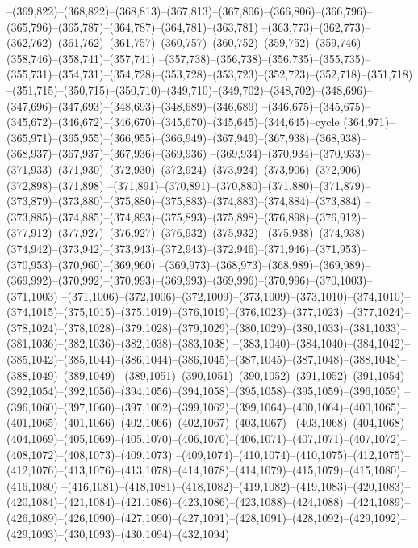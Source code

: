 --(369,822)--(368,822)--(368,813)--(367,813)--(367,806)--(366,806)--(366,796)--(365,796)--(365,787)--(364,787)--(364,781)--(363,781)
--(363,773)--(362,773)--(362,762)--(361,762)--(361,757)--(360,757)--(360,752)--(359,752)--(359,746)--(358,746)--(358,741)--(357,741)
--(357,738)--(356,738)--(356,735)--(355,735)--(355,731)--(354,731)--(354,728)--(353,728)--(353,723)--(352,723)--(352,718)--(351,718)
--(351,715)--(350,715)--(350,710)--(349,710)--(349,702)--(348,702)--(348,696)--(347,696)--(347,693)--(348,693)--(348,689)--(346,689)
--(346,675)--(345,675)--(345,672)--(346,672)--(346,670)--(345,670)--(345,645)--(344,645)--cycle
(364,971)--(365,971)--(365,955)--(366,955)--(366,949)--(367,949)--(367,938)--(368,938)--(368,937)--(367,937)--(367,936)--(369,936)
--(369,934)--(370,934)--(370,933)--(371,933)--(371,930)--(372,930)--(372,924)--(373,924)--(373,906)--(372,906)--(372,898)--(371,898)
--(371,891)--(370,891)--(370,880)--(371,880)--(371,879)--(373,879)--(373,880)--(375,880)--(375,883)--(374,883)--(374,884)--(373,884)
--(373,885)--(374,885)--(374,893)--(375,893)--(375,898)--(376,898)--(376,912)--(377,912)--(377,927)--(376,927)--(376,932)--(375,932)
--(375,938)--(374,938)--(374,942)--(373,942)--(373,943)--(372,943)--(372,946)--(371,946)--(371,953)--(370,953)--(370,960)--(369,960)
--(369,973)--(368,973)--(368,989)--(369,989)--(369,992)--(370,992)--(370,993)--(369,993)--(369,996)--(370,996)--(370,1003)--(371,1003)
--(371,1006)--(372,1006)--(372,1009)--(373,1009)--(373,1010)--(374,1010)--(374,1015)--(375,1015)--(375,1019)--(376,1019)--(376,1023)--(377,1023)
--(377,1024)--(378,1024)--(378,1028)--(379,1028)--(379,1029)--(380,1029)--(380,1033)--(381,1033)--(381,1036)--(382,1036)--(382,1038)--(383,1038)
--(383,1040)--(384,1040)--(384,1042)--(385,1042)--(385,1044)--(386,1044)--(386,1045)--(387,1045)--(387,1048)--(388,1048)--(388,1049)--(389,1049)
--(389,1051)--(390,1051)--(390,1052)--(391,1052)--(391,1054)--(392,1054)--(392,1056)--(394,1056)--(394,1058)--(395,1058)--(395,1059)--(396,1059)
--(396,1060)--(397,1060)--(397,1062)--(399,1062)--(399,1064)--(400,1064)--(400,1065)--(401,1065)--(401,1066)--(402,1066)--(402,1067)--(403,1067)
--(403,1068)--(404,1068)--(404,1069)--(405,1069)--(405,1070)--(406,1070)--(406,1071)--(407,1071)--(407,1072)--(408,1072)--(408,1073)--(409,1073)
--(409,1074)--(410,1074)--(410,1075)--(412,1075)--(412,1076)--(413,1076)--(413,1078)--(414,1078)--(414,1079)--(415,1079)--(415,1080)--(416,1080)
--(416,1081)--(418,1081)--(418,1082)--(419,1082)--(419,1083)--(420,1083)--(420,1084)--(421,1084)--(421,1086)--(423,1086)--(423,1088)--(424,1088)
--(424,1089)--(426,1089)--(426,1090)--(427,1090)--(427,1091)--(428,1091)--(428,1092)--(429,1092)--(429,1093)--(430,1093)--(430,1094)--(432,1094)
